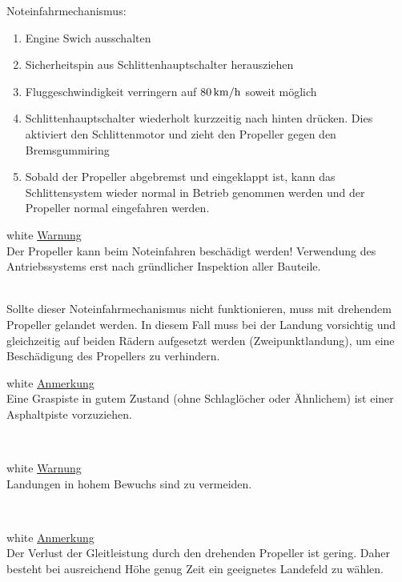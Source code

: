 Noteinfahrmechanismus:
\begin{enumerate}
\item Engine Swich ausschalten
\item Sicherheitspin aus Schlittenhauptschalter herausziehen
\item Fluggeschwindigkeit verringern auf $\unit[80]{km/h}$ soweit möglich
\item Schlittenhauptschalter wiederholt kurzzeitig nach hinten drücken. Dies aktiviert den Schlittenmotor und zieht den Propeller gegen den Bremsgummiring
\item Sobald der Propeller abgebremst und eingeklappt ist, kann das Schlittensystem wieder normal in Betrieb genommen werden und der Propeller normal eingefahren werden.
\end{enumerate}

\begin{color}{white}
\large{\underline{Warnung}}\\
Der Propeller kann beim Noteinfahren beschädigt werden! Verwendung des Antriebssystems erst nach gründlicher Inspektion aller Bauteile.
\end{color}\\

Sollte dieser Noteinfahrmechanismus nicht funktionieren, muss mit drehendem Propeller gelandet werden. In diesem Fall muss bei der Landung vorsichtig und gleichzeitig auf beiden Rädern aufgesetzt werden (Zweipunktlandung), um eine Beschädigung des Propellers zu verhindern.\\

\begin{color}{white}
\large{\underline{Anmerkung}}\\
Eine Graspiste in gutem Zustand (ohne Schlaglöcher oder Ähnlichem) ist einer Asphaltpiste vorzuziehen.
\end{color}\\

\begin{color}{white}
\large{\underline{Warnung}}\\
Landungen in hohem Bewuchs sind zu vermeiden.
\end{color}\\

\begin{color}{white}
\large{\underline{Anmerkung}}\\
Der Verlust der Gleitleistung durch den drehenden Propeller ist gering. Daher besteht bei ausreichend Höhe genug Zeit ein geeignetes Landefeld zu wählen.
\end{color}\\

